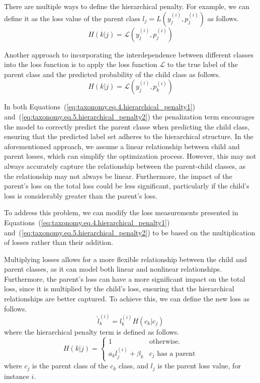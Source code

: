 There are multiple ways to define the hierarchical penalty. For example, we can define it as the loss value of the parent class $l_j=L\left(y_j^{(i)},p_j^{(i)}\right) $ as follows.
\begin{equation}
    H(k \vert j)=\mathcal{L} \left(y_j^{(i)},p_j^{(i)}\right)
    \label{eq:taxonomy.eq.4.hierarchical_penalty1}
\end{equation}

Another approach to incorporating the interdependence between different classes into the loss function is to apply the loss function $\mathcal{L} $ to the true label of the parent class and the predicted probability of the child class as follows.
\begin{equation}
    H\left(k\vert j\right) = \mathcal{L} \left(y_j^{(i)},p_k^{(i)}\right)
    \label{eq:taxonomy.eq.5.hierarchical_penalty2}
\end{equation}

In both Equations~(\ref{eq:taxonomy.eq.4.hierarchical_penalty1}) and~(\ref{eq:taxonomy.eq.5.hierarchical_penalty2}) the penalization term encourages the model to correctly predict the parent classe when predicting the child class, ensuring that the predicted label set adheres to the hierarchical structure. In the aforementioned approach, we assume a linear relationship between child and parent losses, which can simplify the optimization process. However, this may not always accurately capture the relationship between the parent-child classes, as the relationship may not always be linear. Furthermore, the impact of the parent's loss on the total loss could be less significant, particularly if the child's loss is considerably greater than the parent's loss.

To address this problem, we can modify the loss measurements presented in Equations~(\ref{eq:taxonomy.eq.4.hierarchical_penalty1}) and~(\ref{eq:taxonomy.eq.5.hierarchical_penalty2}) to be based on the multiplication of losses rather than their addition.

Multiplying losses allows for a more flexible relationship between the child and parent classes, as it can model both linear and nonlinear relationships. Furthermore, the parent's loss can have a more significant impact on the total loss, since it is multiplied by the child's loss, ensuring that the hierarchical relationships are better captured. To achieve this, we can define the new loss as follows.
\begin{equation}
    \label{eq:taxonomy.eq.7.newloss}
    \widehat{l}_k^{(i)} = l_k^{(i)} H \left( c_k \vert c_j \right)
\end{equation}
where the hierarchical penalty term is defined as follows.
\begin{equation}
    \label{eq:taxonomy.eq.8.hierarchical_penalty.loss}
    H(k \vert j) = \left\{ \begin{array}{lc}1 & \text{otherwise.} \\ a_k l_j^{(i)} + \beta_k & c_j \text{ has a parent} \end{array} \right.
\end{equation}
where $c_j $ is the parent class of the $c_k $ class, and $l_j $ is the parent loss value, for instance $i $.

